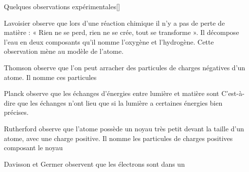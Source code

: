 \newpage
\vspace*{-36pt}
\begin{doc}{Quelques observations expérimentales}[\label{doc:observations_exp_atome}]
  \begin{listePoints}
    \item {} Lavoisier observe que lors d'une réaction chimique il n'y a pas de perte de matière : « Rien ne se perd, rien ne se crée, tout se transforme ».
    Il décompose l'eau en deux composants qu'il nomme l'oxygène et l'hydrogène.
    Cette observation mène au modèle de l'atome.
    \item {} Thomson observe que l’on peut arracher des particules de charges négatives d’un atome.
    Il nomme ces particules 
    \item {} Planck observe que les échanges d'énergies entre lumière et matière sont 
    C'est-à-dire que les échanges n'ont lieu que si la lumière a certaines énergies bien précises.
    \item {} Rutherford observe que l'atome possède un noyau très petit devant la taille d’un atome, avec une charge positive.
    Il nomme les particules de charges positives composant le noyau 
    \item {} Davisson et Germer observent que les électrons sont  dans un 
  \end{listePoints}
\end{doc}

